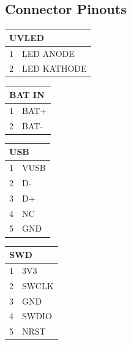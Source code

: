 \documentclass[12pt, a4paper]{article}
\begin{document}
\pagebreak
\subsection{Connector Pinouts}
\begin{center}
\begin{minipage}[t][3cm][t]{0.24\textwidth}
\centering
\begin{tabular}{|l|l|}
\hline
\multicolumn{2}{|p{2cm}|}{\centering\textbf{UVLED}} \\ \hline
1               & LED ANODE                \\ \hline
2               & LED KATHODE                \\ \hline
\end{tabular}
\end{minipage}
\begin{minipage}[t][3cm][t]{0.24\textwidth}
\centering
\begin{tabular}{|l|l|}
\hline
\multicolumn{2}{|p{2cm}|}{\centering\textbf{BAT IN}} \\ \hline
1               & BAT+                \\ \hline
2               & BAT-                 \\ \hline
\end{tabular}
\end{minipage}


\begin{minipage}[t][3.5cm][t]{0.24\textwidth}
\centering
\begin{tabular}{|l|l|}
\hline
\multicolumn{2}{|p{3cm}|}{\centering\textbf{USB}} \\ \hline
1               & VUSB         \\ \hline
2               & D-        \\ \hline
3               & D+        \\ \hline
4               & NC         \\ \hline
5               & GND     \\ \hline
\end{tabular}
\end{minipage}
\begin{minipage}[t][3cm][t]{0.24\textwidth}
\centering
\begin{tabular}{|l|l|}
\hline
\multicolumn{2}{|p{2cm}|}{\centering\textbf{SWD}} \\ \hline
1               & 3V3               \\ \hline
2               & SWCLK             \\ \hline
3               & GND               \\ \hline
4               & SWDIO             \\ \hline
5               & NRST              \\ \hline
\end{tabular}
\hfill
\end{minipage}


\end{center}
\end{document}
